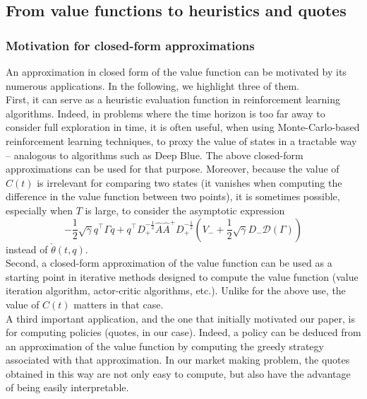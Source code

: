 \documentclass[preprint, 3p]{elsarticle}
\newcommand{\1}{{\chi}}
\begin{document}
\subsection{From value functions to heuristics and quotes}
\vspace{3mm}
\subsubsection{Motivation for closed-form approximations}
\vspace{3mm}
An approximation in closed form of the value function can be motivated by its numerous applications. In the following, we highlight three of them.\\

First, it can serve as a heuristic evaluation function in reinforcement learning algorithms. Indeed, in problems where the time horizon is too far away to consider full exploration in time, it is often useful, when using Monte-Carlo-based reinforcement learning techniques, to proxy the value of states in a tractable way -- analogous to algorithms such as Deep Blue. The above closed-form approximations can be used for that purpose. Moreover, because the value of $C(t)$ is irrelevant for comparing two states (it vanishes when computing the difference in the value function between two points), it is sometimes possible, especially when $T$ is large, to consider the asymptotic expression $$-\frac 12 \sqrt{\gamma} q^\intercal \Gamma q + q^\intercal D_+^{-\frac 12}\widehat{A}\widehat{A}^+ D_+^{-\frac 12} \left(V_- + \frac{1}{2}\sqrt{\gamma} D_- \mathcal D(\Gamma)\right) $$ instead of $\check\theta(t,q)$.\\

Second, a closed-form approximation of the value function can be used as a starting point in iterative methods designed to compute the value function (value iteration algorithm, actor-critic algorithms, etc.). Unlike for the above use, the value of $C(t)$ matters in that case.\\

A third important application, and the one that initially motivated our paper, is for computing policies (quotes, in our case). Indeed, a policy can be deduced from an approximation of the value function by computing the greedy strategy associated with that approximation. In our market making problem, the quotes obtained in this way are not only easy to compute, but also have the advantage of being easily interpretable.\\
\end{document}
